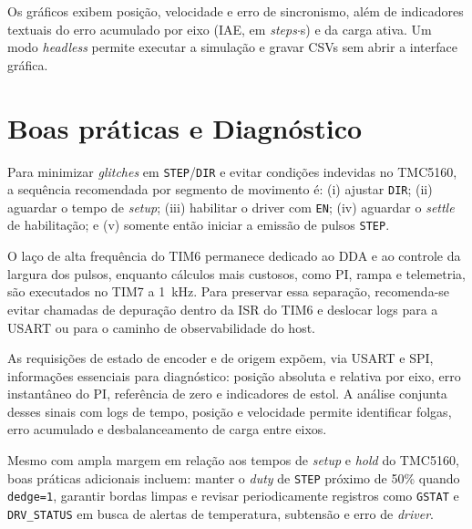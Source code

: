 Os gr\'aficos exibem posi\c{c}\~ao, velocidade e erro de sincronismo, al\'em
de indicadores textuais do erro acumulado por eixo (IAE, em
\emph{steps}$\cdot$s) e da carga ativa. Um modo \emph{headless} permite
executar a simula\c{c}\~ao e gravar CSVs sem abrir a interface gr\'afica.

\section{Boas pr\'aticas e Diagn\'ostico}
\label{sec:boas_praticas_diag}

Para minimizar \emph{glitches} em \texttt{STEP}/\texttt{DIR} e evitar
condi\c{c}\~oes indevidas no TMC5160, a sequ\^encia recomendada por
segmento de movimento \'e: (i) ajustar \texttt{DIR};
(ii) aguardar o tempo de \emph{setup};
(iii) habilitar o driver com \texttt{EN};
(iv) aguardar o \emph{settle} de habilita\c{c}\~ao; e
(v) somente ent\~ao iniciar a emiss\~ao de pulsos \texttt{STEP}.

O la\c{c}o de alta frequ\^encia do TIM6 permanece dedicado ao DDA e ao
controle da largura dos pulsos, enquanto c\'alculos mais custosos, como
PI, rampa e telemetria, s\~ao executados no TIM7 a
\SI{1}{\kilo\hertz}. Para preservar essa separa\c{c}\~ao, recomenda-se
evitar chamadas de depura\c{c}\~ao dentro da ISR do TIM6 e deslocar logs
para a USART ou para o caminho de observabilidade do host.

As requisi\c{c}\~oes de estado de encoder e de origem exp\~oem, via USART
e SPI, informa\c{c}\~oes essenciais para diagn\'ostico: posi\c{c}\~ao
absoluta e relativa por eixo, erro instant\^aneo do PI, refer\^encia de
zero e indicadores de estol. A an\'alise conjunta desses sinais com logs
de tempo, posi\c{c}\~ao e velocidade permite identificar folgas, erro
acumulado e desbalanceamento de carga entre eixos.

Mesmo com ampla margem em rela\c{c}\~ao aos tempos de \emph{setup} e
\emph{hold} do TMC5160, boas pr\'aticas adicionais incluem: manter o
\emph{duty} de \texttt{STEP} pr\'oximo de 50\% quando \texttt{dedge=1},
garantir bordas limpas e revisar periodicamente registros como
\texttt{GSTAT} e \texttt{DRV\_STATUS} em busca de alertas de temperatura,
subtens\~ao e erro de \emph{driver}.
